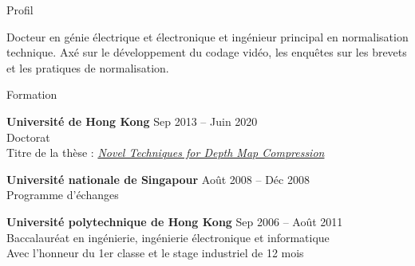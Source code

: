 \documentclass{resume} %
\begin{document}

\begin{rSection}{Profil}

Docteur en génie électrique et électronique et ingénieur principal en normalisation technique. Axé sur le développement du codage vidéo, les enquêtes sur les brevets et les pratiques de normalisation.

\end{rSection}


\begin{rSection}{Formation}

{\bf Université de Hong Kong} \hfill {Sep 2013 -- Juin 2020} \\ 
Doctorat \\
Titre de la thèse : \href{http://hdl.handle.net/10722/318421}{\textit{Novel Techniques for Depth Map Compression}}

{\bf Université nationale de Singapour} \hfill {Août 2008 -- Déc 2008} \\ 
Programme d'échanges

{\bf Université polytechnique de Hong Kong} \hfill {Sep 2006 -- Août 2011} \\ 
Baccalauréat en ingénierie, ingénierie électronique et informatique \\
Avec l'honneur du 1er classe et le stage industriel de 12 mois

\end{rSection}

\end{document}
